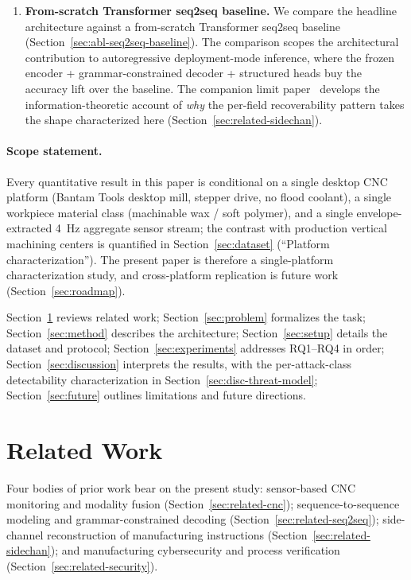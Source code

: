 \documentclass[sensors,article,submit,moreauthors,pdftex]{Definitions/mdpi}
\begin{document}
\begin{enumerate}[label=\textbf{(\arabic*)}, leftmargin=*]
\item \textbf{From-scratch Transformer seq2seq baseline.} We compare the headline architecture against a from-scratch Transformer seq2seq baseline (Section~\ref{sec:abl-seq2seq-baseline}). The comparison scopes the architectural contribution to autoregressive deployment-mode inference, where the frozen encoder + grammar-constrained decoder + structured heads buy the accuracy lift over the baseline. The companion limit paper~\cite{paperB_entropy} develops the information-theoretic account of \emph{why} the per-field recoverability pattern takes the shape characterized here (Section~\ref{sec:related-sidechan}).
\end{enumerate}

\paragraph{Scope statement.} Every quantitative result in this paper is conditional on a single desktop CNC platform (Bantam Tools desktop mill, stepper drive, no flood coolant), a single workpiece material class (machinable wax / soft polymer), and a single envelope-extracted 4~Hz aggregate sensor stream; the contrast with production vertical machining centers is quantified in Section~\ref{sec:dataset} (``Platform characterization''). The present paper is therefore a single-platform characterization study, and cross-platform replication is future work (Section~\ref{sec:roadmap}).

Section~\ref{sec:related} reviews related work; Section~\ref{sec:problem} formalizes the task; Section~\ref{sec:method} describes the architecture; Section~\ref{sec:setup} details the dataset and protocol; Section~\ref{sec:experiments} addresses RQ1--RQ4 in order; Section~\ref{sec:discussion} interprets the results, with the per-attack-class detectability characterization in Section~\ref{sec:disc-threat-model}; Section~\ref{sec:future} outlines limitations and future directions.

\section{Related Work}
\label{sec:related}

Four bodies of prior work bear on the present study: sensor-based CNC monitoring and modality fusion (Section~\ref{sec:related-cnc}); sequence-to-sequence modeling and grammar-constrained decoding (Section~\ref{sec:related-seq2seq}); side-channel reconstruction of manufacturing instructions (Section~\ref{sec:related-sidechan}); and manufacturing cybersecurity and process verification (Section~\ref{sec:related-security}).
\end{document}
